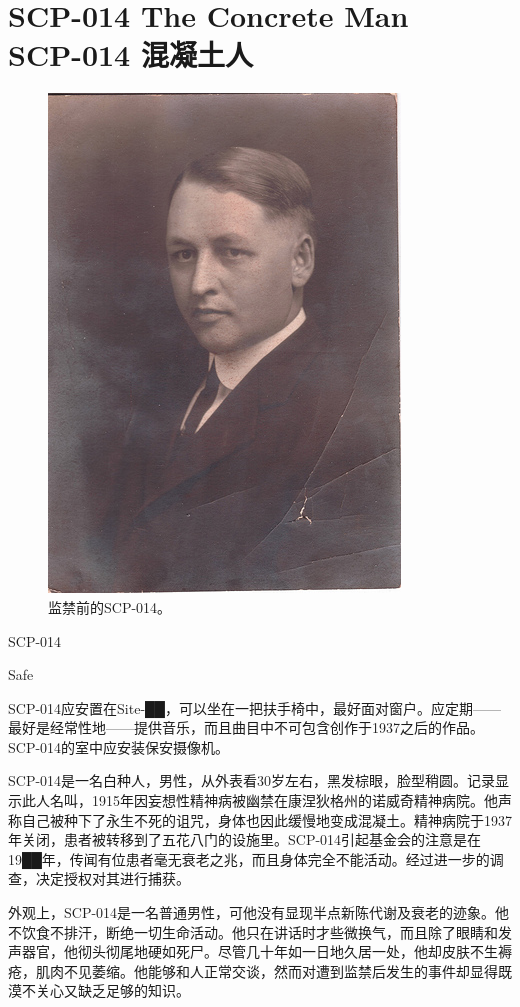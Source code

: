 \chapter[SCP-014 混凝土人]{
    SCP-014 The Concrete Man\\
    SCP-014 混凝土人
}

\label{chap:SCP-014}

\begin{figure}[H]
    \centering
    \includegraphics[width=0.5\linewidth]{images/SCP-014.jpg}
    \caption*{监禁前的SCP-014。}
\end{figure}

SCP-014

Safe

SCP-014应安置在Site-██，可以坐在一把扶手椅中，最好面对窗户。应定期——最好是经常性地——提供音乐，而且曲目中不可包含创作于1937之后的作品。SCP-014的室中应安装保安摄像机。

SCP-014是一名白种人，男性，从外表看30岁左右，黑发棕眼，脸型稍圆。记录显示此人名叫，1915年因妄想性精神病被幽禁在康涅狄格州的诺威奇精神病院。他声称自己被种下了永生不死的诅咒，身体也因此缓慢地变成混凝土。精神病院于1937年关闭，患者被转移到了五花八门的设施里。SCP-014引起基金会的注意是在19██年，传闻有位患者毫无衰老之兆，而且身体完全不能活动。经过进一步的调查，决定授权对其进行捕获。

外观上，SCP-014是一名普通男性，可他没有显现半点新陈代谢及衰老的迹象。他不饮食不排汗，断绝一切生命活动。他只在讲话时才些微换气，而且除了眼睛和发声器官，他彻头彻尾地硬如死尸。尽管几十年如一日地久居一处，他却皮肤不生褥疮，肌肉不见萎缩。他能够和人正常交谈，然而对遭到监禁后发生的事件却显得既漠不关心又缺乏足够的知识。

\\

